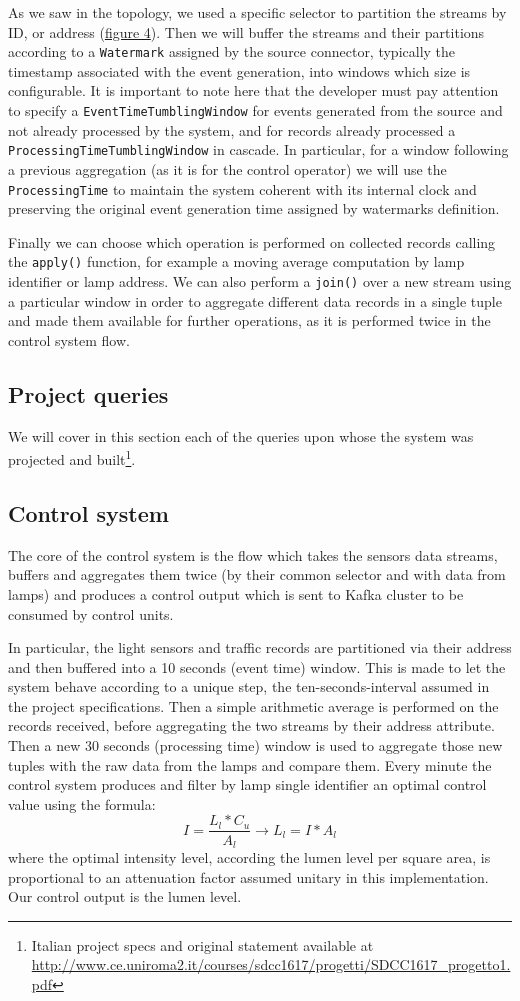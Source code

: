 As we saw in the topology, we used a specific selector to partition the streams by ID, or address (\hyperref[fig:ember_operation_flow]{figure 4}).  Then we will buffer the streams and their partitions according to a \texttt{Watermark} assigned by the source connector, typically the timestamp associated with the event generation, into windows which size is configurable. It is important to note here that the developer must pay attention to specify a \texttt{EventTimeTumblingWindow} for events generated from the source and not already processed by the system, and for records already processed a \texttt{ProcessingTimeTumblingWindow} in cascade. In particular, for a window following a previous aggregation (as it is for the control operator) we will use the \texttt{ProcessingTime} to maintain the system coherent with its internal clock and preserving the original event generation time assigned by watermarks definition.

Finally we can choose which operation is performed on collected records calling the \texttt{apply()} function, for example a moving average computation by lamp identifier or lamp address. We can also perform a \texttt{join()} over a new stream using a particular window in order to aggregate different data records in a single tuple and made them available for further operations, as it is performed twice in the control system flow.

\subsection{Project queries}
We will cover in this section each of the queries upon whose the system was projected and built\footnote{Italian project specs and original statement available at \url{http://www.ce.uniroma2.it/courses/sdcc1617/progetti/SDCC1617_progetto1.pdf}}.

\subsection*{Control system}
The core of the control system is the flow which takes the sensors data streams, buffers and aggregates them twice (by their common selector and with data from lamps) and produces a control output which is sent to Kafka cluster to be consumed by control units.

In particular, the light sensors and traffic records are partitioned via their address and then buffered into a 10 seconds (event time) window. This is made to let the system behave according to a unique step, the ten-seconds-interval assumed in the project specifications. Then a simple arithmetic average is performed on the records received, before aggregating the two streams by their address attribute. Then a new 30 seconds (processing time) window is used to aggregate those new tuples with the raw data from the lamps and compare them. Every minute the control system produces and filter by lamp single identifier an optimal control value using the formula:
	$$I = \frac{L_l*C_u}{A_l} \rightarrow L_l = I * A_l$$
where the optimal intensity level, according the lumen level per square area, is proportional to an attenuation factor assumed unitary in this implementation. Our control output is the lumen level.

